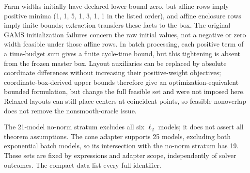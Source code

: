 Farm widths initially have declared lower bound zero, but affine rows imply positive minima (1, 1, 5, 1, 3, 1, 1 in the listed order), and affine enclosure rows imply finite bounds; extraction transfers these facts to the box. The original GAMS initialization failures concern the raw initial values, not a negative or zero width feasible under those affine rows. In batch processing, each positive term of a time-budget sum gives a finite cycle-time bound, but this tightening is absent from the frozen master box. Layout auxiliaries can be replaced by absolute coordinate differences without increasing their positive-weight objectives; coordinate-box-derived upper bounds therefore give an optimization-equivalent bounded formulation, but change the full feasible set and were not imposed here. Relaxed layouts can still place centers at coincident points, so feasible nonoverlap does not remove the nonsmooth-oracle issue.

The 21-model no-norm stratum excludes all six $\ell_2$ models; it does not assert all theorem assumptions. The cone adapter supports 25 models, excluding both exponential batch models, so its intersection with the no-norm stratum has 19. These sets are fixed by expressions and adapter scope, independently of solver outcomes. The compact data list every full identifier.


